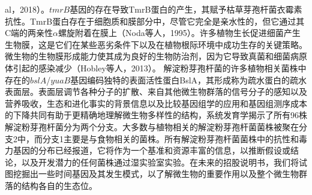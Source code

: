 \documentclass[UTF8]{ctexart}
\begin{document}
al，2018）。$tmrB$基因的存在导致TmrB蛋白的产生，其赋予枯草芽孢杆菌衣霉素抗性。TmrB蛋白存在于细胞质和膜部分中，尽管它完全是亲水性的，但它通过其C端的两亲性$\alpha$螺旋附着在膜上（Noda等人，1995）。许多植物生长促进细菌产生生物膜，这是它们在某些恶劣条件下以及在植物根际环境中成功生存的关键策略。 微生物的生物膜形成能力使其成为良好的生物防治剂，因为它导致真菌和细菌病原体引起的感染减少（Hobley等人，2013）。 解淀粉芽孢杆菌的许多植物相关菌株中存在的$bslA$/$yuaB$基因编码独特的表面活性蛋白BslA，其形成称为疏水蛋白的疏水表面层。表面层调节各种分子的扩散、来自其他微生物群落的信号分子的感知以及营养吸收，生态和进化事实的背景信息以及比较基因组学的应用和基因组测序成本的下降共同有助于更精确地理解微生物多样性的结构，系统发育学揭示了所有96株解淀粉芽孢杆菌分为两个分支。大多数与植物相关的解淀粉芽孢杆菌菌株被聚在分支2中，而分支1主要是与食物相关的菌株。所有解淀粉芽孢杆菌菌株中的抗性和毒力基因的分布已经报道，它将作为一个基准和资源丰富的信息，以推断假设或结论，以及开发潜力的任何菌株通过湿实验室实验。在未来的招股说明书，我们将试图挖掘出一些时间基因及其发生模式，以了解微生物的重要作用以及整个微生物群落的结构各自的生态位。

\end{document}
